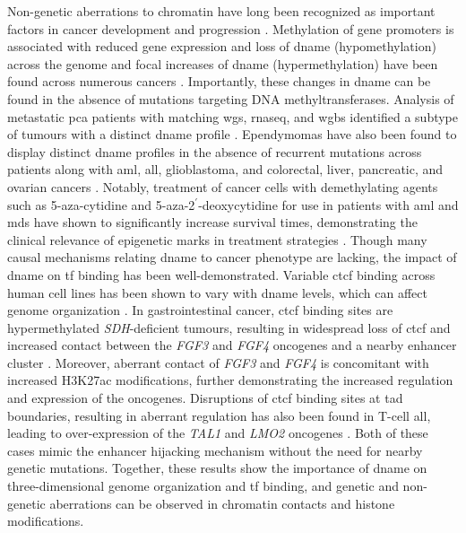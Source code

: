 Non-genetic aberrations to chromatin have long been recognized as important factors in cancer development and progression \cite{jonesCancerepigeneticsComesAge1999,jonesFundamentalRoleEpigenetic2002}.
Methylation of gene promoters is associated with reduced gene expression and loss of \gls{dname} (hypomethylation) across the genome and focal increases of \gls{dname} (hypermethylation) have been found across numerous cancers \cite{jonesFundamentalRoleEpigenetic2002,feinbergHistoryCancerEpigenetics2004}.
Importantly, these changes in \gls{dname} can be found in the absence of mutations targeting DNA methyltransferases.
Analysis of  metastatic \gls{pca} patients with matching \gls{wgs}, \gls{rnaseq}, and \gls{wgbs} identified a subtype of tumours with a distinct \gls{dname} profile \cite{zhaoDNAMethylationLandscape2020}.
Ependymomas have also been found to display distinct \gls{dname} profiles in the absence of recurrent mutations across patients \cite{mackEpigenomicAlterationsDefine2014} along with \gls{aml}, \gls{all}, glioblastoma, and colorectal, liver, pancreatic, and ovarian cancers \cite{issaCpGIslandMethylator2004}.
Notably, treatment of cancer cells with demethylating agents such as 5-aza-cytidine and 5-aza-2$^\prime$-deoxycytidine for use in patients with \gls{aml} and \gls{mds} have shown to significantly increase survival times, demonstrating the clinical relevance of epigenetic marks in treatment strategies \cite{schmelzInductionGeneExpression2005,azadFutureEpigeneticTherapy2013,kellyEpigeneticModificationsTherapeutic2010}.
Though many causal mechanisms relating \gls{dname} to cancer phenotype are lacking, the impact of \gls{dname} on \gls{tf} binding has been well-demonstrated.
Variable \gls{ctcf} binding across human cell lines has been shown to vary with \gls{dname} levels, which can affect genome organization \cite{wangWidespreadPlasticityCTCF2012,mauranoRoleDNAMethylation2015}.
In gastrointestinal cancer, \gls{ctcf} binding sites are hypermethylated \emph{SDH}-deficient tumours, resulting in widespread loss of \gls{ctcf} and increased contact between the \emph{FGF3} and \emph{FGF4} oncogenes and a nearby enhancer cluster \cite{flavahanAlteredChromosomalTopology2019}.
Moreover, aberrant contact of \emph{FGF3} and \emph{FGF4} is concomitant with increased H3K27ac modifications, further demonstrating the increased regulation and expression of the oncogenes.
Disruptions of \gls{ctcf} binding sites at \gls{tad} boundaries, resulting in aberrant regulation has also been found in T-cell \gls{all}, leading to over-expression of the \emph{TAL1} and \emph{LMO2} oncogenes \cite{hniszActivationProtooncogenesDisruption2016}.
Both of these cases mimic the enhancer hijacking mechanism without the need for nearby genetic mutations.
Together, these results show the importance of \gls{dname} on three-dimensional genome organization and \gls{tf} binding, and genetic and non-genetic aberrations can be observed in chromatin contacts and histone modifications.

